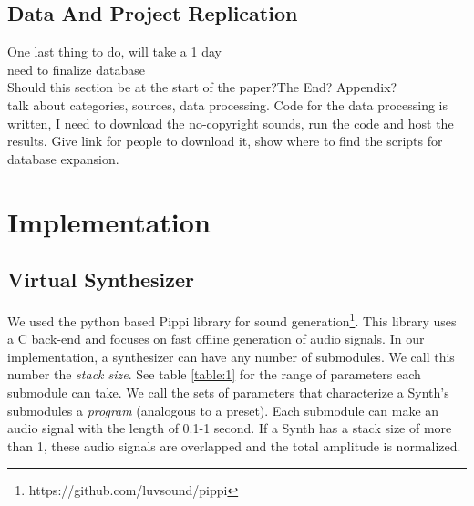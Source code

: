 \documentclass{nime-alternate} %
\begin{document}
\subsection{Data And Project Replication}
\colorbox{green!=30}{One last thing to do, will take a 1 day}\\
\colorbox{green!=30}{need to finalize database}\\
\colorbox{blue!=30}{Should this section be at the start of the paper?The End? Appendix?}\\
talk about  categories, sources, data processing. 
Code for the data processing is written, I need to download the no-copyright sounds, run the code and host the results. 
Give link for people to download it, show where to find the scripts for database expansion.
\section{Implementation}
\label{impl}


\subsection{Virtual Synthesizer}
We used the python based Pippi library for sound generation\footnote{https://github.com/luvsound/pippi}. This library uses a C back-end and focuses on fast offline generation of audio signals. In our implementation, a synthesizer can have any number of submodules. We call this number the \textit{stack size}. See table \ref{table:1} for the range of parameters each submodule can take. We call the sets of parameters that characterize a Synth's submodules a \textit{program} (analogous to a preset).  Each submodule can make an audio signal with the length of 0.1-1 second. If a Synth has a stack size of more than 1, these audio signals are overlapped and the total amplitude is normalized.\\
\end{document}
